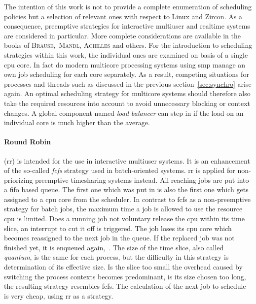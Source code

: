 The intention of this work is not to provide a complete enumeration of scheduling policies but a selection of relevant ones with respect to Linux and Zircon.
As a consequence, preemptive strategies for interactive multiuser and realtime systems are considered in particular.
More complete considerations are available in the books of \textsc{Brause}\cite{brause2017betriebssysteme},~\textsc{Mandl}\cite{mandl2014Grundkurs}, \textsc{Achilles}\cite{achilles2006betriebssysteme} and others.
For the introduction to scheduling strategies within this work, the individual ones are examined on basis of a single \ac{cpu} core.
In fact do modern multicore processing systems using \ac{smp} manage an own job scheduling for each core separately.
As a result, competing situations for processes and threads such as discussed in the previous section~\ref{sec:synchro} arise again.
An optimal scheduling strategy for multicore systems should therefore also take the required resources into account to avoid unnecessary blocking or context changes\cite{brause2017betriebssysteme}.
A global component named \textit{load balancer} can step in if the load on an individual core is much higher than the average\cite{achilles2006betriebssysteme}.

\paragraph{Round Robin}
(\acs{rr}) is intended for the use in interactive multiuser systems.
It is an enhancement of the so-called \textit{\ac{fcfs}} strategy used in batch-oriented systems. 
\ac{rr} is applied for non-priorizing preemptive timesharing systems instead\cite{achilles2006betriebssysteme}.
All reaching jobs are put into a \ac{fifo} based queue.
The first one which was put in is also the first one which gets assigned to a \ac{cpu} core from the scheduler.
In contrast to \ac{fcfs} as a non-preemptive strategy for batch jobs, the maximum time a job is allowed to use the resource \ac{cpu} is limited.
Does a running job not voluntary release the \ac{cpu} within its time slice, an interrupt to cut it off is triggered.
The job loses its \ac{cpu} core which becomes reassigned to the next job in the queue.
If the replaced job was not finished yet, it is enqueued again\cite{achilles2006betriebssysteme},~\cite{mandl2014Grundkurs}.
The size of the time slice, also called \textit{quantum}, is the same for each process, but the difficulty in this strategy is determination of its effective size\cite{brause2017betriebssysteme}.
Is the slice too small the overhead caused by switching the process contexts becomes predominant, is its size chosen too long, the resulting strategy resembles \ac{fcfs}.
The calculation of the next job to schedule is very cheap, using \ac{rr} as a strategy\cite{brause2017betriebssysteme}.

